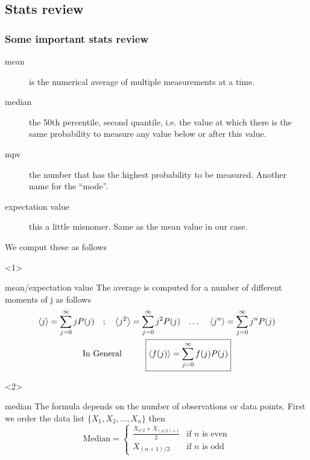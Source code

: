 \subsection{Stats review}

\begin{frame}
    \frametitle{Some important stats review}
\begin{description}
    \item[mean] is the numerical average of multiple measurements at a time.
    \item[median] the 50th percentile, second quantile, i.e. the value at which there
    is the same probability to measure any value below or after this value.
    \item[mpv] the number that has the highest probability to be measured.
    Another name for the ``mode''.
    \item[expectation value]  this a little misnomer. Same as the mean value in our case.
\end{description}
We comput these as follows


\begin{onlyenv}<1>

    \begin{block}{mean/expectation value}
        The average is computed for a number of different moments of j as follows
        \begin{gather}
            \ev{j}= \sum_{j=0}^\infty j P(j) \qq{;} \ev{j^2} = \sum_{j=0}^\infty j^2 P(j) \qq{\dots} \ev{j^n} = \sum_{j=0}^\infty j^n P(j)\\
           \text{In General} \hspace{1cm} \boxed{\ev{f(j)} = \sum_{j=0}^\infty f(j) P(j)}
        \end{gather}

    \end{block}

\end{onlyenv}

\begin{onlyenv}<2>

    \begin{block}{median}
        The formula depends on the number of observations or data points. First we order the data list
        $\{X_1, X_2, \dots, X_n\}$ then
        \[
        \text{Median} =
        \begin{cases}
            \frac{X_{n/2} + X_{(n/2)+1}}{2} & \text{if } n \text{ is even} \\
            X_{(n+1)/2} & \text{if } n \text{ is odd}
        \end{cases}
        \]

    \end{block}

\end{onlyenv}

\end{frame}


